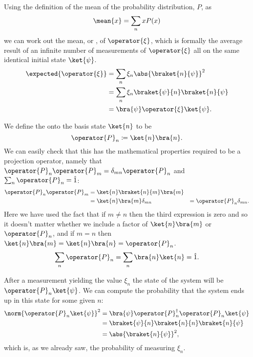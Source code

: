 \documentclass[fleqn]{NotesClass}
\newcommand*{\idop}{\hat{1}}
\newcommand*{\hermit}{\dagger}
\begin{document}
    Using the definition of the mean of the probability distribution, \(P\), as
    \begin{equation}
        \mean{x} = \sum_n xP(x)
    \end{equation}
    we can work out the mean, or , of \(\operator{\xi}\), which is formally the average result of an infinite number of measurements of \(\operator{\xi}\) all on the same identical initial state \(\ket{\psi}\).
    \begin{align}
        \expected{\operator{\xi}} &= \sum_n \xi_n \abs{\braket{n}{\psi}}^2\\
        &= \sum_n \xi_n \braket{\psi}{n}\braket{n}{\psi}\\
        &= \bra{\psi}\operator{\xi}\ket{\psi}.
    \end{align}
    
    We define the  onto the basis state \(\ket{n}\) to be
    \begin{equation}
        \operator{P}_n \coloneqq \ket{n}\bra{n}.
    \end{equation}
    We can easily check that this has the mathematical properties required to be a projection operator, namely that \(\operator{P}_n\operator{P}_m = \delta_{mn}\operator{P}_n\) and \(\sum_n \operator{P}_n = \idop\):
    \begin{align}
        \operator{P}_n\operator{P}_m &= \ket{n}\braket{n}{m}\bra{m}\\
        &= \ket{n}\bra{m}\delta_{mn}
        &= \operator{P}_n\delta_{mn}.
    \end{align}
    Here we have used the fact that if \(m\ne n\) then the third expression is zero and so it doesn't matter whether we include a factor of \(\ket{n}\bra{m}\) or \(\operator{P}_n\), and if \(m = n\) then \(\ket{n}\bra{m} = \ket{n}\bra{n} = \operator{P}_n\).
    \begin{align}
        \sum_n \operator{P}_n = \sum_n \bra{n}\ket{n} = \idop.
    \end{align}
    
    After a measurement yielding the value \(\xi_n\) the state of the system will be \(\operator{P}_n\ket{\psi}\).
    We can compute the probability that the system ends up in this state for some given \(n\):
    \begin{align}
        \norm{\operator{P}_n\ket{\psi}}^2 &= \bra{\psi}\operator{P}_n^\hermit \operator{P}_n\ket{\psi}\\
        &= \braket{\psi}{n}\braket{n}{n}\braket{n}{\psi}\\
        &= \abs{\braket{n}{\psi}}^2,
    \end{align}
    which is, as we already saw, the probability of measuring \(\xi_n\).
    
\end{document}
